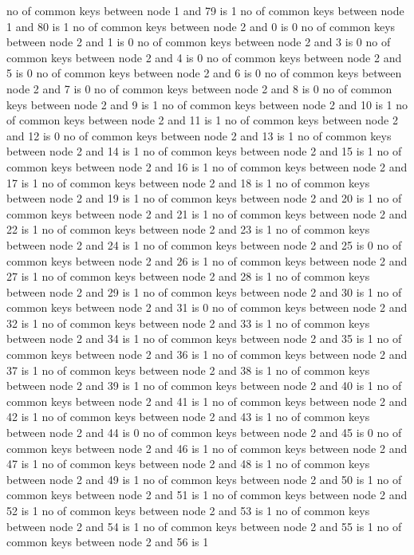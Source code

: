 no of common keys between node 1 and 79 is 1
no of common keys between node 1 and 80 is 1
no of common keys between node 2 and 0 is 0
no of common keys between node 2 and 1 is 0
no of common keys between node 2 and 3 is 0
no of common keys between node 2 and 4 is 0
no of common keys between node 2 and 5 is 0
no of common keys between node 2 and 6 is 0
no of common keys between node 2 and 7 is 0
no of common keys between node 2 and 8 is 0
no of common keys between node 2 and 9 is 1
no of common keys between node 2 and 10 is 1
no of common keys between node 2 and 11 is 1
no of common keys between node 2 and 12 is 0
no of common keys between node 2 and 13 is 1
no of common keys between node 2 and 14 is 1
no of common keys between node 2 and 15 is 1
no of common keys between node 2 and 16 is 1
no of common keys between node 2 and 17 is 1
no of common keys between node 2 and 18 is 1
no of common keys between node 2 and 19 is 1
no of common keys between node 2 and 20 is 1
no of common keys between node 2 and 21 is 1
no of common keys between node 2 and 22 is 1
no of common keys between node 2 and 23 is 1
no of common keys between node 2 and 24 is 1
no of common keys between node 2 and 25 is 0
no of common keys between node 2 and 26 is 1
no of common keys between node 2 and 27 is 1
no of common keys between node 2 and 28 is 1
no of common keys between node 2 and 29 is 1
no of common keys between node 2 and 30 is 1
no of common keys between node 2 and 31 is 0
no of common keys between node 2 and 32 is 1
no of common keys between node 2 and 33 is 1
no of common keys between node 2 and 34 is 1
no of common keys between node 2 and 35 is 1
no of common keys between node 2 and 36 is 1
no of common keys between node 2 and 37 is 1
no of common keys between node 2 and 38 is 1
no of common keys between node 2 and 39 is 1
no of common keys between node 2 and 40 is 1
no of common keys between node 2 and 41 is 1
no of common keys between node 2 and 42 is 1
no of common keys between node 2 and 43 is 1
no of common keys between node 2 and 44 is 0
no of common keys between node 2 and 45 is 0
no of common keys between node 2 and 46 is 1
no of common keys between node 2 and 47 is 1
no of common keys between node 2 and 48 is 1
no of common keys between node 2 and 49 is 1
no of common keys between node 2 and 50 is 1
no of common keys between node 2 and 51 is 1
no of common keys between node 2 and 52 is 1
no of common keys between node 2 and 53 is 1
no of common keys between node 2 and 54 is 1
no of common keys between node 2 and 55 is 1
no of common keys between node 2 and 56 is 1
